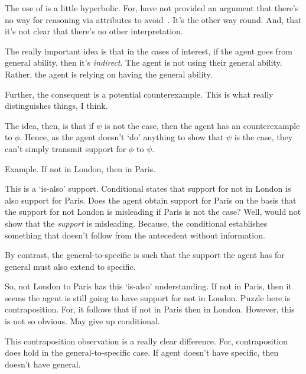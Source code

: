 \begin{note}
  The use of \AR{} is a little hyperbolic.
  For, have not provided an argument that there's no way for reasoning via attributes to avoid~\nI{}.
  It's the other way round.
  And, that it's not clear that there's no other interpretation.
\end{note}

\begin{note}[Indirect]
  The really important idea is that in the cases of interest, if the agent goes from general ability, then it's \emph{indirect}.
  The agent is not using their general ability.
  Rather, the agent is relying on having the general ability.

  Further, the consequent is a potential counterexample.
  This is what really distinguishes things, I think.

  The idea, then, is that if \(\psi\) is not the case, then the agent has an counterexample to \(\phi\).
  Hence, as the agent doesn't `do' anything to show that \(\psi\) is the case, they can't simply transmit support for \(\phi\) to \(\psi\).
\end{note}

\begin{note}
  Example.
  If not in London, then in Paris.

  This is a `is-also' support.
  Conditional states that support for not in London is also support for Paris.
  Does the agent obtain support for Paris on the basis that the support for not London is misleading if Paris is not the case?
  Well, would not show that the \emph{support} is misleading.
  Because, the conditional establishes something that doesn't follow from the antecedent without information.

  By contrast, the general-to-specific is such that the support the agent has for general must also extend to specific.

  So, not London to Paris has this `is-also' understanding.
  If not in Paris, then it seems the agent is still going to have support for not in London.
  Puzzle here is contraposition.
  For, it follows that if not in Paris then in London.
  However, this is not so obvious.
  May give up conditional.

  This contraposition observation is a really clear difference.
  For, contraposition does hold in the general-to-specific case.
  If agent doesn't have specific, then doesn't have general.
\end{note}


